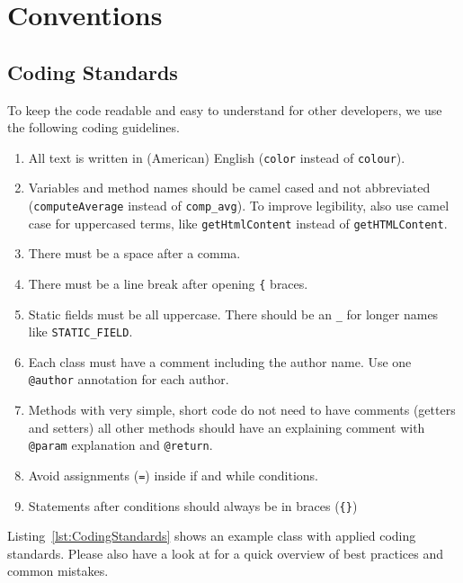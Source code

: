 \chapter{Conventions}

\section{Coding Standards}
To keep the code readable and easy to understand for other developers, we use the following coding guidelines.

\begin{enumerate}

	\item All text is written in (American) English (\texttt{color} instead of \texttt{colour}).

	\item Variables and method names should be camel cased and not abbreviated (\texttt{computeAverage} instead of \texttt{comp\_avg}). To improve legibility, also use camel case for uppercased terms, like \texttt{getHtmlContent} instead of \texttt{getHTMLContent}.

	\item There must be a space after a comma.

	\item There must be a line break after opening \texttt{\{} braces.

	\item Static fields must be all uppercase. There should be an \texttt{\_} for longer names like \texttt{STATIC\_FIELD}.

	\item Each class must have a comment including the author name. Use one \texttt{@author} annotation for each author.

	\item Methods with very simple, short code do not need to have comments (getters and setters) all other methods should have an explaining comment with \texttt{@param} explanation and \texttt{@return}.

	\item Avoid assignments (\texttt{=}) inside if and while conditions.

	\item Statements after conditions should always be in braces (\texttt{\{\}})
	
\end{enumerate}

Listing~\ref{lst:CodingStandards} shows an example class with applied coding standards. Please also have a look at \cite{JavaCodeConventions, JavaAntiPatterns} for a quick overview of best practices and common mistakes.

